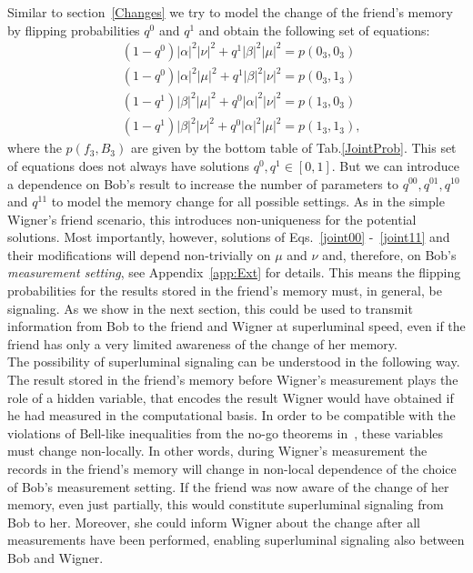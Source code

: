 \documentclass[a4paper,twocolumn,11pt,accepted=2017-05-09,dvipsnames]{quantumarticle}
\numberwithin{equation}{section}
\begin{document}
Similar to section~\ref{Changes} we try to model the change of the friend's memory by flipping probabilities $q^0$ and $q^1$ and obtain the following set of equations:
\begin{align}
\label{joint00}
&(1-q^0)|\alpha|^2 |\nu|^2+q^1|\beta|^2|\mu|^2=  p(0_3,0_3)\\
\label{joint01}
&(1-q^0)|\alpha|^2 |\mu|^2+q^1|\beta|^2|\nu|^2= p(0_3,1_3)\\
 \label{joint10}
&(1-q^1)|\beta|^2|\mu|^2 +q^0|\alpha|^2 |\nu|^2 =p(1_3,0_3)\\
\label{joint11}
 &(1-q^1)|\beta|^2|\nu|^2+q^0|\alpha|^2 |\mu|^2 =p(1_3,1_3),
\end{align}
where the $p(f_3,B_3)$ are given by the bottom table of Tab.\ref{JointProb}. This set of equations does not always have solutions $q^0,q^1 \in [0,1]$. But we can introduce a dependence on Bob's result to increase the number of parameters to $q^{00},q^{01},q^{10}$ and $q^{11}$ to model the memory change for all possible settings. As in the simple Wigner's friend scenario, this introduces non-uniqueness for the potential solutions. Most importantly, however, solutions of Eqs.~\eqref{joint00} -~\eqref{joint11} and their modifications will depend non-trivially on $\mu$ and $\nu$ and, therefore, on Bob's \emph{measurement setting}, see Appendix~\ref{app:Ext} for details. This means the flipping probabilities for the results stored in the friend's memory must, in general, be signaling. As we show in the next section, this could be used to transmit information from Bob to the friend and Wigner at superluminal speed, even if the friend has only a very limited awareness of the change of her memory. \\

The possibility of superluminal signaling can be understood in the following way. The result stored in the friend's memory before Wigner's measurement plays the role of a hidden variable, that encodes the result Wigner would have obtained if he had measured in the computational basis. In order to be compatible with the violations of Bell-like inequalities from the no-go theorems in~\cite{Bong2020,brukner2018no}, these variables must change non-locally. In other words, during Wigner's measurement the records in the friend's memory will change in non-local dependence of the choice of Bob's measurement setting. If the friend was now aware of the change of her memory, even just partially, this would constitute superluminal signaling from Bob to her. Moreover, she could inform Wigner about the change after all measurements have been performed, enabling superluminal signaling also between Bob and Wigner.
\end{document}

